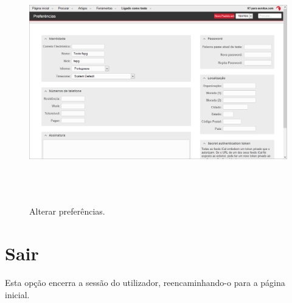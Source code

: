 \begin{figure}[H]
\begin{center}
\includegraphics[width=16cm,height=10.5cm]{include/img/rt5-1-PT}
\end{center}
\caption{Alterar preferências.}
\label{fig:boot}
\end{figure}

\section{Sair}
Esta opção encerra a sessão do utilizador, reencaminhando-o para a página inicial.



